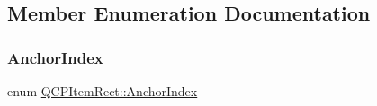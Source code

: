 \subsection{Member Enumeration Documentation}
\mbox{\label{class_q_c_p_item_rect_af0ebba58e6bca4851c4db726691ec0d3}} 
\subsubsection{\texorpdfstring{Anchor\+Index}{AnchorIndex}}
{\footnotesize\ttfamily enum \hyperlink{class_q_c_p_item_rect_af0ebba58e6bca4851c4db726691ec0d3}{Q\+C\+P\+Item\+Rect\+::\+Anchor\+Index}\hspace{0.3cm}{\ttfamily [protected]}}

